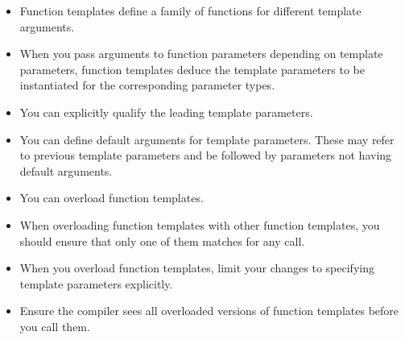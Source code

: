 
\begin{itemize}
\item
Function templates define a family of functions for different template arguments.

\item 
When you pass arguments to function parameters depending on template parameters, function templates deduce the template parameters to be instantiated for the corresponding parameter types.

\item
You can explicitly qualify the leading template parameters.

\item 
You can define default arguments for template parameters. These may refer to previous template parameters and be followed by parameters not having default arguments.

\item
You can overload function templates.

\item 
When overloading function templates with other function templates, you should ensure that only one of them matches for any call.

\item
When you overload function templates, limit your changes to specifying template parameters explicitly.

\item 
Ensure the compiler sees all overloaded versions of function templates before you call them.
\end{itemize}